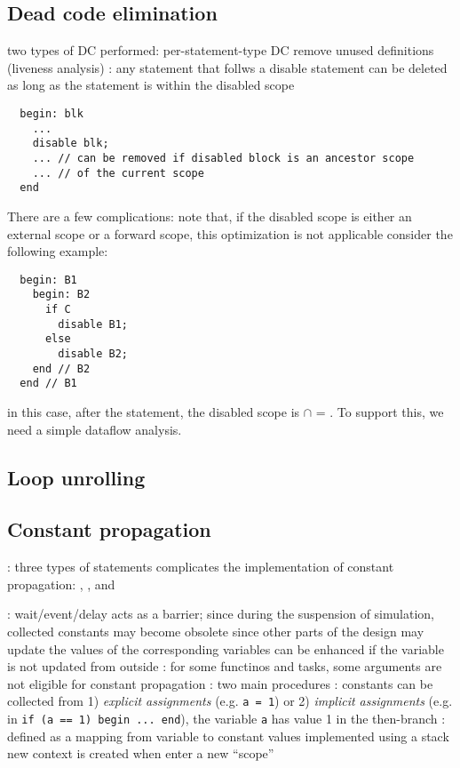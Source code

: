 \documentclass{note}
\begin{document}
\subsection{Dead code elimination}
\bit
\w two types of DC performed:
   \bit
   \w per-statement-type DC 
   \w remove unused definitions (liveness analysis)
   \eit
\w {}: any statement that follws a disable
statement can be deleted as long as the statement is within the disabled scope
  \begin{verbatim}
  begin: blk
    ... 
    disable blk;
    ... // can be removed if disabled block is an ancestor scope
    ... // of the current scope
  end
  \end{verbatim}
  There are a few complications:
  \bit
  \w note that, if the disabled scope is either an external scope or a forward
  scope, this optimization is not applicable
  \w consider the following example:
  \begin{verbatim}
  begin: B1
    begin: B2
      if C
        disable B1;
      else
        disable B2;
    end // B2
  end // B1
  \end{verbatim}
   in this case, after the  statement, the disabled scope is
    $\cap$  = . To support this, we need a simple dataflow
   analysis. 
  \eit
\eit

\subsection{Loop unrolling}

\subsection{Constant propagation}
\bit
\w {}: three types of statements complicates the implementation of constant
propagation: , , and 

\w {}: wait/event/delay acts as
a barrier; since during the suspension of simulation, collected constants may
become obsolete since other parts of the design may update the values of the
corresponding variables
   \bit
   \w can be enhanced if the variable is not updated from outside
   \eit
\w {}: for some functinos and tasks,
some arguments are not eligible for constant propagation
\w {}: two main procedures
  \bit
  \w {}: constants can be collected from 1) {\em explicit
    assignments\/} (e.g. \verb+a = 1+) or 2) {\em implicit assignments\/}
  (e.g. in \verb+if (a == 1) begin ... end+), the variable \verb+a+ has value
  1 in the then-branch
  \w {}
  \eit
\w {}: defined as a mapping from variable to constant values
  \bit
  \w implemented using a stack
  \w new context is created when enter a new ``scope''
   \eit
\eit
\end{document}

